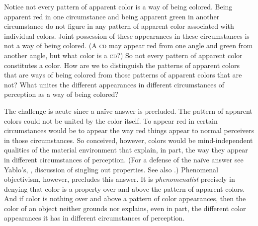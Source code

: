 \documentclass[12pt]{article}
\begin{document}
Notice not every pattern of apparent color is a way of being colored. Being apparent red in one circumstance and being apparent green in another circumstance do not figure in any pattern of apparent color associated with individual colors. Joint possession of these appearances in these circumstances is not a way of being colored. (A \textsc{cd} may appear red from one angle and green from another angle, but what color is a \textsc{cd}?) So not every pattern of apparent color constitutes a color. How are we to distinguish the patterns of apparent colors that are ways of being colored from those patterns of apparent colors that are not? What unites the different appearances in different circumstances of perception as a way of being colored?

The challenge is acute since a naïve answer is precluded. The pattern of apparent colors could not be united by the color itself. To appear red in certain circumstances would be to appear the way red things appear to normal perceivers in those circumstances. So conceived, however, colors would be mind-in\-de\-pen\-dent qualities of the material environment that explain, in part, the way they appear in different circumstances of perception. (For a defense of the naïve answer see Yablo's, \citeyear{Yablo:1995fk}, discussion of singling out properties. See also \citealp{Campbell:1997dq}.) Phenomenal objectivism, however, precludes this answer. It is \emph{phenomenalist} precisely in denying that color is a property over and above the pattern of apparent colors. And if color is nothing over and above a pattern of color appearances, then the color of an object neither grounds nor explains, even in part, the different color appearances it has in different circumstances of perception.
\end{document}
